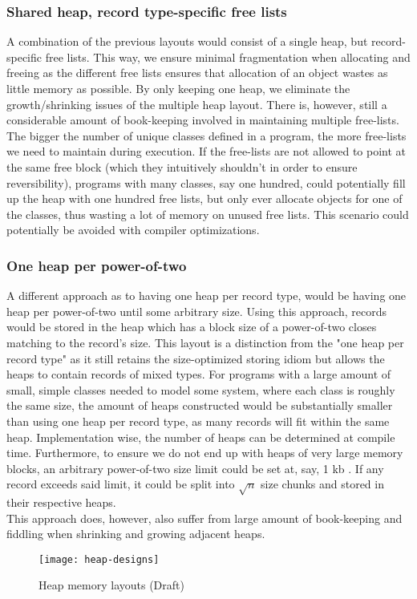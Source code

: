 
\subsubsection{Shared heap, record type-specific free lists}
A combination of the previous layouts would consist of a single heap, but record-specific free lists. This way, we ensure minimal fragmentation when allocating and freeing as the different free lists ensures that allocation of an object wastes as little memory as possible. By only keeping one heap, we eliminate the growth/shrinking issues of the multiple heap layout. There is, however, still a considerable amount of book-keeping involved in maintaining multiple free-lists. The bigger the number of unique classes defined in a program, the more free-lists we need to maintain during execution. If the free-lists are not allowed to point at the same free block (which they intuitively shouldn't in order to ensure reversibility), programs with many classes, say one hundred, could potentially fill up the heap with one hundred free lists, but only ever allocate objects for one of the classes, thus wasting a lot of memory on unused free lists. This scenario could potentially be avoided with compiler optimizations.\\


\subsubsection{One heap per power-of-two}
A different approach as to having one heap per record type, would be having one heap per power-of-two until some arbitrary size. Using this approach, records would be stored in the heap which has a block size of a power-of-two closes matching to the record's size. This layout is a distinction from the "one heap per record type" as it still retains the size-optimized storing idiom but allows the heaps to contain records of mixed types. For programs with a large amount of small, simple classes needed to model some system, where each class is roughly the same size, the amount of heaps constructed would be substantially smaller than using one heap per record type, as many records will fit within the same heap. Implementation wise, the number of heaps can be determined at compile time. Furthermore, to ensure we do not end up with heaps of very large memory blocks, an arbitrary power-of-two size limit could be set at, say, 1 kb . If any record exceeds said limit, it could be split into $\sqrt{n}$ size chunks and stored in their respective heaps.\\
This approach does, however, also suffer from large amount of book-keeping and fiddling when shrinking and growing adjacent heaps.

\begin{figure}[H]
  \centering
  \texttt{[image: heap-designs]}
  \caption{Heap memory layouts (Draft)}
\end{figure}
